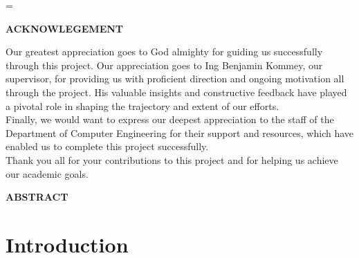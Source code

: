 =\documentclass[12pt, a4paper]{article}
\begin{document}
\begin{center}
\textbf{ACKNOWLEGEMENT}
\end{center}
Our greatest appreciation goes to God almighty for guiding us successfully through this project. Our appreciation goes to Ing Benjamin Kommey, our supervisor, for providing us with proficient direction and ongoing motivation all through the project. His valuable insights and constructive feedback have played a pivotal role in shaping the trajectory and extent of our efforts.\\
Finally, we would want to express our deepest appreciation to the staff of the Department of Computer Engineering for their support and resources, which have enabled us to complete this project successfully.\\ Thank you all for your contributions to this project and for helping us achieve our academic goals.
\newpage

\begin{center}
\textbf{ABSTRACT}
\end{center}

\newpage


\tableofcontents
\newpage
{}
\section{Introduction}
\end{document}
